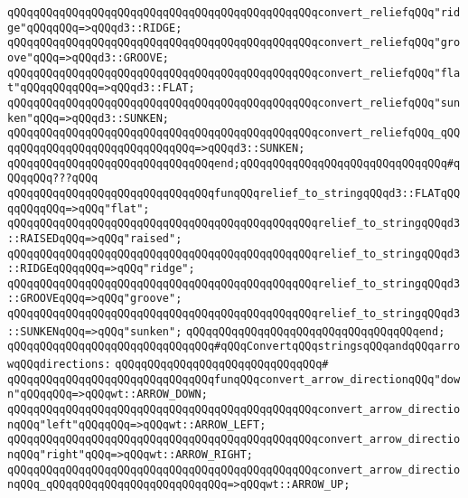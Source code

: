 \verb|qQQqqQQqqQQqqQQqqQQqqQQqqQQqqQQqqQQqqQQqqQQqqQQqconvert_reliefqQQq"ridge"qQQqqQQq=>qQQqd3::RIDGE;|\newline
\verb|qQQqqQQqqQQqqQQqqQQqqQQqqQQqqQQqqQQqqQQqqQQqqQQqconvert_reliefqQQq"groove"qQQq=>qQQqd3::GROOVE;|\newline
\verb|qQQqqQQqqQQqqQQqqQQqqQQqqQQqqQQqqQQqqQQqqQQqqQQqconvert_reliefqQQq"flat"qQQqqQQqqQQq=>qQQqd3::FLAT;|\newline
\verb|qQQqqQQqqQQqqQQqqQQqqQQqqQQqqQQqqQQqqQQqqQQqqQQqconvert_reliefqQQq"sunken"qQQq=>qQQqd3::SUNKEN;|\newline
\verb|qQQqqQQqqQQqqQQqqQQqqQQqqQQqqQQqqQQqqQQqqQQqqQQqconvert_reliefqQQq_qQQqqQQqqQQqqQQqqQQqqQQqqQQqqQQq=>qQQqd3::SUNKEN;|\newline
\verb|qQQqqQQqqQQqqQQqqQQqqQQqqQQqqQQqend;qQQqqQQqqQQqqQQqqQQqqQQqqQQqqQQq#qQQqqQQq???qQQq|\newline
\newline
\verb|qQQqqQQqqQQqqQQqqQQqqQQqqQQqqQQqfunqQQqrelief_to_stringqQQqd3::FLATqQQqqQQqqQQq=>qQQq"flat";|\newline
\verb|qQQqqQQqqQQqqQQqqQQqqQQqqQQqqQQqqQQqqQQqqQQqqQQqrelief_to_stringqQQqd3::RAISEDqQQq=>qQQq"raised";|\newline
\verb|qQQqqQQqqQQqqQQqqQQqqQQqqQQqqQQqqQQqqQQqqQQqqQQqrelief_to_stringqQQqd3::RIDGEqQQqqQQq=>qQQq"ridge";|\newline
\verb|qQQqqQQqqQQqqQQqqQQqqQQqqQQqqQQqqQQqqQQqqQQqqQQqrelief_to_stringqQQqd3::GROOVEqQQq=>qQQq"groove";|\newline
\verb|qQQqqQQqqQQqqQQqqQQqqQQqqQQqqQQqqQQqqQQqqQQqqQQqrelief_to_stringqQQqd3::SUNKENqQQq=>qQQq"sunken";|\newline
\verb|qQQqqQQqqQQqqQQqqQQqqQQqqQQqqQQqqQQqend;|\newline
\newline
\verb|qQQqqQQqqQQqqQQqqQQqqQQqqQQqqQQq#qQQqConvertqQQqstringsqQQqandqQQqarrowqQQqdirections:|\newline
\verb|qQQqqQQqqQQqqQQqqQQqqQQqqQQqqQQq#|\newline
\verb|qQQqqQQqqQQqqQQqqQQqqQQqqQQqqQQqfunqQQqconvert_arrow_directionqQQq"down"qQQqqQQq=>qQQqwt::ARROW_DOWN;|\newline
\verb|qQQqqQQqqQQqqQQqqQQqqQQqqQQqqQQqqQQqqQQqqQQqqQQqconvert_arrow_directionqQQq"left"qQQqqQQq=>qQQqwt::ARROW_LEFT;|\newline
\verb|qQQqqQQqqQQqqQQqqQQqqQQqqQQqqQQqqQQqqQQqqQQqqQQqconvert_arrow_directionqQQq"right"qQQq=>qQQqwt::ARROW_RIGHT;|\newline
\verb|qQQqqQQqqQQqqQQqqQQqqQQqqQQqqQQqqQQqqQQqqQQqqQQqconvert_arrow_directionqQQq_qQQqqQQqqQQqqQQqqQQqqQQqqQQq=>qQQqwt::ARROW_UP;|\newline
